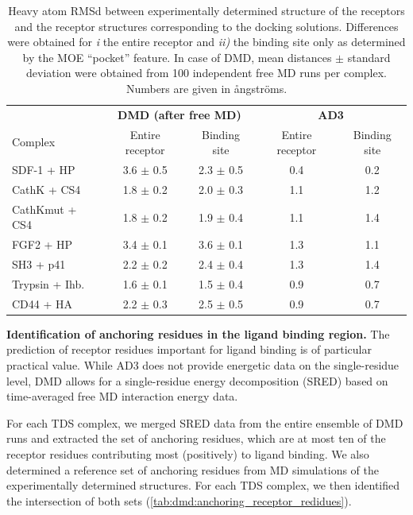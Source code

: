 \begin{table}
\tiny
\centering
\renewcommand{\arraystretch}{1.3}
\begin{tabular}{@{}lcccc@{}}
\toprule
& \multicolumn{2}{c}{\textbf{DMD (after free MD)}} & \multicolumn{2}{c}{\textbf{AD3}} \\
Complex & Entire receptor & Binding site &  Entire receptor & Binding site \\
\midrule
SDF-1 + HP & 3.6 $\pm$ 0.5 & 2.3 $\pm$ 0.5 &  0.4 & 0.2 \\
CathK + CS4 & 1.8 $\pm$ 0.2 & 2.0 $\pm$ 0.3 & 1.1 & 1.2 \\
CathKmut + CS4 & 1.8 $\pm$ 0.2 & 1.9 $\pm$ 0.4 & 1.1 & 1.4 \\
FGF2 + HP & 3.4 $\pm$ 0.1 & 3.6 $\pm$ 0.1 & 1.3 & 1.1 \\
SH3 + p41 & 2.2 $\pm$ 0.2&  2.4 $\pm$ 0.4 &  1.3 & 1.4 \\
Trypsin + Ihb. & 1.6 $\pm$ 0.1 & 1.5 $\pm$ 0.4 & 0.9 & 0.7 \\
CD44 + HA & 2.2 $\pm$ 0.3 & 2.5 $\pm$ 0.5 & 0.9 & 0.7 \\
\bottomrule
\end{tabular}
\caption{
Heavy atom RMSd between experimentally determined structure of the receptors and
the receptor structures corresponding to the docking solutions. Differences were
obtained for \textit{i} the entire receptor and \textit{ii)} the binding site
only as determined by the MOE \enquote{pocket} feature. In case of DMD, mean
distances $\pm$ standard deviation were obtained from 100 independent free MD
runs per complex. Numbers are given in ångströms.
}
\label{tab:dmd:binding_site_rmsd}
\end{table}

\vspace{1cm}
\textbf{Identification of anchoring residues in the ligand binding
region.} The prediction of receptor residues important for ligand binding is of
particular practical value. While AD3 does not provide energetic data on the
single-residue level, DMD allows for a single-residue energy decomposition
(SRED) based on time-averaged free MD interaction energy data.

For each TDS complex, we merged SRED data from the entire ensemble of DMD runs
and extracted the set of anchoring residues, which are at most ten of the
receptor residues contributing most (positively) to ligand binding. We also
determined a reference set of anchoring residues from MD simulations of the
experimentally determined structures. For each TDS complex, we then identified
the intersection of both sets (\cref{tab:dmd:anchoring_receptor_redidues}).


